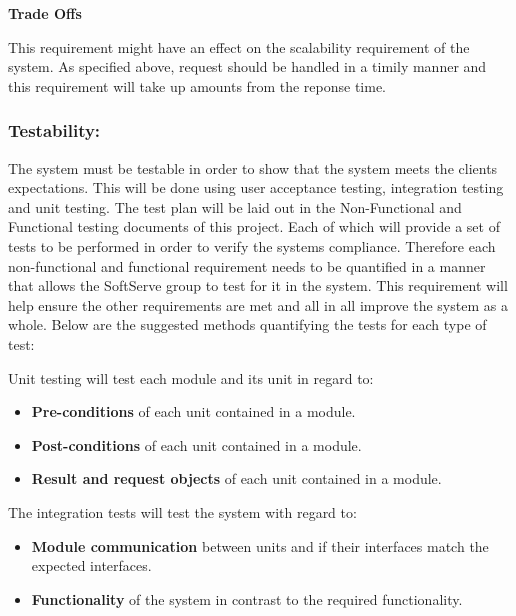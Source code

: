 \begin{flushleft}
\textbf{Trade Offs}

This requirement might have an effect on the scalability requirement of the system. As specified above, request should be handled in a timily manner and this requirement will take up amounts from the reponse time.
\vspace{0.1in}

\subsubsection{Testability:}

\begin{flushleft}

The system must be testable in order to show that the system meets the clients expectations. This will be done using user acceptance testing, integration testing and unit testing. The test plan will be laid out in the Non-Functional and Functional testing documents of this project. Each of which will provide a set of tests to be performed in order to verify the systems compliance. Therefore each non-functional and functional requirement needs to be quantified in a manner that allows the SoftServe group to test for it in the system. This requirement will help ensure the other requirements are met and all in all improve the system as a whole. Below are the suggested methods quantifying the tests for each type of test:\\


\vspace{0.1in}

Unit testing will test each module and its unit in regard to:
\begin{itemize}

\item\textbf{Pre-conditions} of each unit contained in a module.
\item\textbf{Post-conditions} of each unit contained in a module.
\item\textbf{Result and request objects} of each unit contained in a module.

\end{itemize}

The integration tests will test the system with regard to:

\begin{itemize}

\item \textbf{Module communication} between units and if their interfaces match the expected interfaces. 
\item \textbf{Functionality} of the system in contrast to the required functionality.


\end{itemize}
\end{flushleft}
\end{flushleft}
